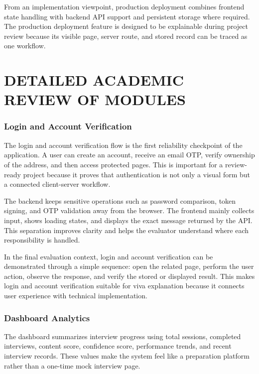 \documentclass[12pt,a4paper]{report}
\begin{document}
From an implementation viewpoint, production deployment combines frontend state handling with backend API support and persistent storage where required. The production deployment feature is designed to be explainable during project review because its visible page, server route, and stored record can be traced as one workflow.

\chapter*{DETAILED ACADEMIC REVIEW OF MODULES}

\subsection{Login and Account Verification}

The login and account verification flow is the first reliability checkpoint of the application. A user can create an account, receive an email OTP, verify ownership of the address, and then access protected pages. This is important for a review-ready project because it proves that authentication is not only a visual form but a connected client-server workflow.

The backend keeps sensitive operations such as password comparison, token signing, and OTP validation away from the browser. The frontend mainly collects input, shows loading states, and displays the exact message returned by the API. This separation improves clarity and helps the evaluator understand where each responsibility is handled.

In the final evaluation context, login and account verification can be demonstrated through a simple sequence: open the related page, perform the user action, observe the response, and verify the stored or displayed result. This makes login and account verification suitable for viva explanation because it connects user experience with technical implementation.

\subsection{Dashboard Analytics}

The dashboard summarizes interview progress using total sessions, completed interviews, content score, confidence score, performance trends, and recent interview records. These values make the system feel like a preparation platform rather than a one-time mock interview page.
\end{document}
